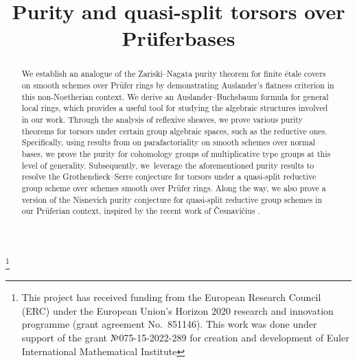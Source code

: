 \documentclass[JEP,XML,SOM,Unicode,published]{cedram}
\theoremstyle{plain}
\theoremstyle{definition}
\begin{document}
\frontmatter
\title{Purity and quasi-split torsors over Prüfer\nobreakspace bases}

\author[\initial{N.} \lastname{Guo}]{ }
\address{St. Petersburg branch of V. A. Steklov Mathematical Institute,\\ Fontanka 27, 191023 St. Petersburg, Russia}

\author[\initial{F.} \lastname{Liu}]{ }
\address{Department of Mathematics, Southern University of Science and Technology,\\
Shenzhen, China}

\thanks{This project has received funding from the European Research Council (ERC) under the European Union's Horizon 2020 research and innovation programme (grant agreement No.~851146).
This work was done under support of the grant №075-15-2022-289 for
creation and development of Euler International Mathematical Institute}

\begin{abstract}
We establish an analogue of the Zariski--Nagata purity theorem for finite étale covers on smooth schemes over Prüfer rings by demonstrating Auslander's flatness criterion in this non-Noetherian context.
We derive an Auslander--Buchsbaum formula for general local rings, which provides a useful tool for studying the algebraic structures involved in our work.
Through the analysis of reflexive sheaves, we prove various purity theorems for torsors under certain group algebraic spaces, such as the reductive ones.
Specifically, using results from \cite{EGAIV4} on parafactoriality on smooth schemes over normal bases, we prove the purity for cohomology groups of multiplicative type groups at this level of generality.
Subsequently, we~leverage the aforementioned purity results to resolve the Grothendieck--Serre conjecture for torsors under a quasi-split reductive group scheme over schemes smooth over Prüfer rings.
Along the way, we also prove a version of the Nisnevich purity conjecture for quasi-split reductive group schemes in our Prüferian context, inspired by the recent work of \v{C}esnavi\v{c}ius \cite{Ces22b}.
\end{abstract}


\end{document}

